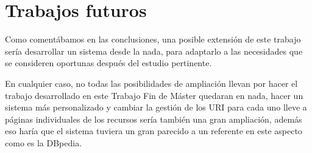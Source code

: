 \section{Trabajos futuros}

Como comentábamos en las conclusiones, una posible extensión de este trabajo sería desarrollar un sistema desde la nada, para adaptarlo a las necesidades que se consideren oportunas después del estudio pertinente.

\bigskip
En cualquier caso, no todas las posibilidades de ampliación llevan por hacer el trabajo desarrollado en este {\sf Trabajo Fin de Máster} quedaran en nada, hacer un sistema más personalizado y cambiar la gestión de los {\sf URI} para cada uno lleve a páginas individuales de los recursos sería también una gran ampliación, además eso haría que el sistema tuviera un gran parecido a un referente en este aspecto como es la DBpedia.